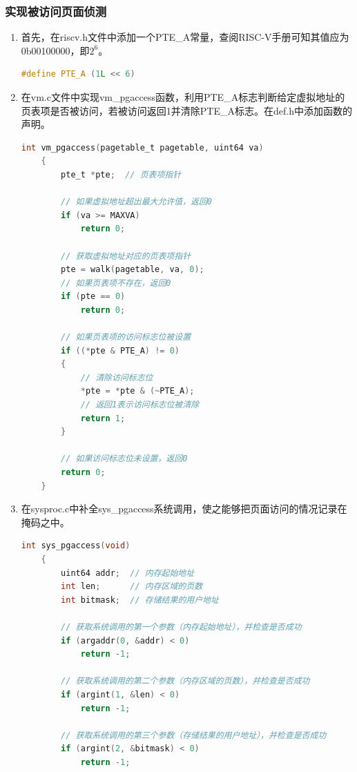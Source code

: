 \subsubsection{实现被访问页面侦测}
\begin{enumerate}
    \item 首先，在riscv.h文件中添加一个PTE\_A常量，查阅RISC-V手册可知其值应为0b00100000，即$2^6$。
          \begin{lstlisting}[language=c, title=PTE\_A的定义]
    #define PTE_A (1L << 6)    
    \end{lstlisting}
    \item 在vm.c文件中实现vm\_pgaccess函数，利用PTE\_A标志判断给定虚拟地址的页表项是否被访问，若被访问返回1并清除PTE\_A标志。在def.h中添加函数的声明。
          \begin{lstlisting}[language=c, title=vm\_pgaccess函数的实现]
    int vm_pgaccess(pagetable_t pagetable, uint64 va)
    {
        pte_t *pte;  // 页表项指针
    
        // 如果虚拟地址超出最大允许值，返回0
        if (va >= MAXVA)
            return 0;
    
        // 获取虚拟地址对应的页表项指针
        pte = walk(pagetable, va, 0);
        // 如果页表项不存在，返回0
        if (pte == 0)
            return 0;
    
        // 如果页表项的访问标志位被设置
        if ((*pte & PTE_A) != 0)
        {
            // 清除访问标志位
            *pte = *pte & (~PTE_A);
            // 返回1表示访问标志位被清除
            return 1;
        }
    
        // 如果访问标志位未设置，返回0
        return 0;
    }
    \end{lstlisting}
    \item 在sysproc.c中补全sys\_pgaccess系统调用，使之能够把页面访问的情况记录在掩码之中。
          \begin{lstlisting}[language=c, title=sys\_pgaccess函数的实现]
    int sys_pgaccess(void)
    {
        uint64 addr;  // 内存起始地址
        int len;      // 内存区域的页数
        int bitmask;  // 存储结果的用户地址
    
        // 获取系统调用的第一个参数（内存起始地址），并检查是否成功
        if (argaddr(0, &addr) < 0)
            return -1;
    
        // 获取系统调用的第二个参数（内存区域的页数），并检查是否成功
        if (argint(1, &len) < 0)
            return -1;
    
        // 获取系统调用的第三个参数（存储结果的用户地址），并检查是否成功
        if (argint(2, &bitmask) < 0)
            return -1;
    

\end{lstlisting}
\end{enumerate}
